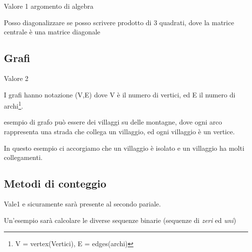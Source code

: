 Valore 1 argomento di algebra

Posso diagonalizzare se posso scrivere prodotto di 3 quadrati, dove la matrice centrale è una matrice diagonale

\subsection{Grafi}

Valore 2

I grafi hanno notazione (V,E) dove V è il numero di vertici, ed E il numero di archi\footnote{V = vertex(Vertici), E = edges(archi)}.

esempio di grafo può essere dei villaggi su delle montagne, dove ogni arco rappresenta una strada che collega un villaggio, ed ogni villaggio è un vertice.

In questo esempio ci accorgiamo che un villaggio è isolato e un villaggio ha molti collegamenti.

\subsection{Metodi di conteggio}

Vale1 e sicuramente sarà presente al secondo pariale.

Un'esempio sarà calcolare le diverse sequenze binarie (sequenze di \textit{zeri} ed \textit{uni})

